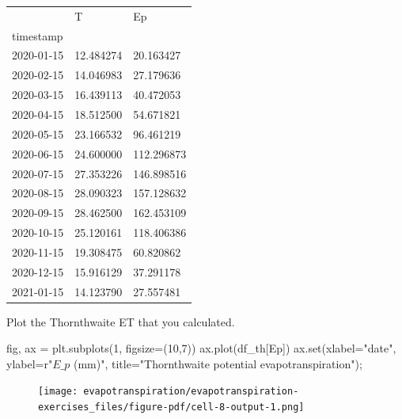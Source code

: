\documentclass[
  letterpaper,
  DIV=11,
  numbers=noendperiod]{scrreprt}
\newenvironment{Shaded}{\begin{snugshade}}{\end{snugshade}}
\newcommand{\BuiltInTok}[1]{\textcolor[rgb]{0.00,0.23,0.31}{#1}}
\newcommand{\DecValTok}[1]{\textcolor[rgb]{0.68,0.00,0.00}{#1}}
\newcommand{\NormalTok}[1]{\textcolor[rgb]{0.00,0.23,0.31}{#1}}
\newcommand{\OperatorTok}[1]{\textcolor[rgb]{0.37,0.37,0.37}{#1}}
\newcommand{\StringTok}[1]{\textcolor[rgb]{0.13,0.47,0.30}{#1}}
\newcommand{\VerbatimStringTok}[1]{\textcolor[rgb]{0.13,0.47,0.30}{#1}}
\begin{document}
\begin{longtable}[]{@{}lll@{}}
\toprule()
& T & Ep \\
timestamp & & \\
\midrule()
\endhead
2020-01-15 & 12.484274 & 20.163427 \\
2020-02-15 & 14.046983 & 27.179636 \\
2020-03-15 & 16.439113 & 40.472053 \\
2020-04-15 & 18.512500 & 54.671821 \\
2020-05-15 & 23.166532 & 96.461219 \\
2020-06-15 & 24.600000 & 112.296873 \\
2020-07-15 & 27.353226 & 146.898516 \\
2020-08-15 & 28.090323 & 157.128632 \\
2020-09-15 & 28.462500 & 162.453109 \\
2020-10-15 & 25.120161 & 118.406386 \\
2020-11-15 & 19.308475 & 60.820862 \\
2020-12-15 & 15.916129 & 37.291178 \\
2021-01-15 & 14.123790 & 27.557481 \\
\bottomrule()
\end{longtable}

Plot the Thornthwaite ET that you calculated.

\begin{Shaded}
\begin{Highlighting}[]
\NormalTok{fig, ax }\OperatorTok{=}\NormalTok{ plt.subplots(}\DecValTok{1}\NormalTok{, figsize}\OperatorTok{=}\NormalTok{(}\DecValTok{10}\NormalTok{,}\DecValTok{7}\NormalTok{))}
\NormalTok{ax.plot(df\_th[}\StringTok{\textquotesingle{}Ep\textquotesingle{}}\NormalTok{])}
\NormalTok{ax.}\BuiltInTok{set}\NormalTok{(xlabel}\OperatorTok{=}\StringTok{"date"}\NormalTok{,}
\NormalTok{       ylabel}\OperatorTok{=}\VerbatimStringTok{r"$E\_p$ (mm)"}\NormalTok{,}
\NormalTok{       title}\OperatorTok{=}\StringTok{"Thornthwaite potential evapotranspiration"}\NormalTok{)}\OperatorTok{;}
\end{Highlighting}
\end{Shaded}

\begin{figure}[H]

{\centering \texttt{[image: evapotranspiration/evapotranspiration-exercises\_files/figure-pdf/cell-8-output-1.png]}

}

\end{figure}
\end{document}
